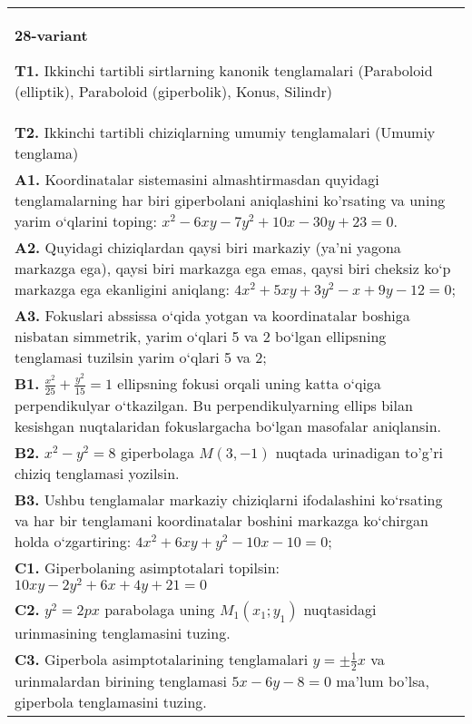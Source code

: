 \documentclass{article}
\begin{document}
\begin{tabular}{m{17cm}}
\textbf{28-variant}
\newline

\textbf{T1.} Ikkinchi tartibli sirtlarning kanonik tenglamalari (Paraboloid (elliptik), Paraboloid (giperbolik), Konus, Silindr) \\
\textbf{T2.} Ikkinchi tartibli chiziqlarning umumiy tenglamalari (Umumiy tenglama) \\
\textbf{A1.} Koordinatalar sistemasini almashtirmasdan quyidagi tenglamalarning har biri giperbolani aniqlashini ko'rsating va uning yarim o‘qlarini toping: $x^2-6 x y-7 y^2+10 x-30 y+23=0$. \\
\textbf{A2.} Quyidagi chiziqlardan qaysi biri markaziy (ya’ni yagona markazga ega), qaysi biri markazga ega emas, qaysi biri cheksiz ko‘p markazga ega ekanligini aniqlang: $4 x^2+5 x y+3 y^2-x+9 y-12=0$; \\
\textbf{A3.} Fokuslari abssissa o‘qida yotgan va koordinatalar boshiga nisbatan simmetrik, yarim o‘qlari 5 va 2 bo‘lgan ellipsning tenglamasi tuzilsin yarim o‘qlari 5 va 2; \\
\textbf{B1.} $\frac{x^2}{25}+\frac{y^2}{15}=1$ ellipsning fokusi orqali uning katta o‘qiga perpendikulyar o‘tkazilgan. Bu perpendikulyarning ellips bilan kesishgan nuqtalaridan fokuslargacha bo‘lgan masofalar aniqlansin. \\
\textbf{B2.} $x^2-y^2=8$ giperbolaga $M(3,-1)$ nuqtada urinadigan to'g'ri chiziq tenglamasi yozilsin. \\
\textbf{B3.} Ushbu tenglamalar markaziy chiziqlarni ifodalashini ko‘rsating va har bir tenglamani koordinatalar boshini markazga ko‘chirgan holda o‘zgartiring: $4 x^2+6 x y+y^2-10 x-10=0$; \\
\textbf{C1.} Giperbolaning asimptotalari topilsin: $10 x y-2 y^2+6 x+4 y+21=0$ \\
\textbf{C2.} $y^2=2 p x$ parabolaga uning $M_1\left(x_1; y_1\right) $ nuqtasidagi urinmasining tenglamasini tuzing. \\
\textbf{C3.} Giperbola asimptotalarining tenglamalari $y= \pm \frac{1}{2} x$ va urinmalardan birining tenglamasi $5 x-6 y-8=0$ ma'lum bo'lsa, giperbola tenglamasini tuzing. \\

\end{tabular}
\vspace{1cm}
\end{document}
